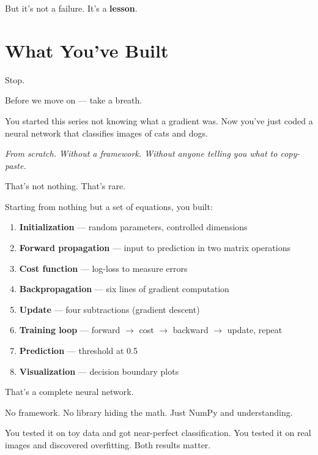 \documentclass[11pt]{article}
\begin{document}
But it's not a failure. It's a \textbf{lesson}.

\section{What You've Built}

Stop.

Before we move on --- take a breath.

You started this series not knowing what a gradient was.
Now you've just coded a neural network that classifies images of cats and dogs.

\textit{From scratch. Without a framework. Without anyone telling you what to copy-paste.}

That's not nothing. That's rare.

Starting from nothing but a set of equations, you built:

\begin{resultbox}[title=Your Neural Network --- From Scratch]
\begin{enumerate}[label=\textbf{\arabic*.}]
  \item \textbf{Initialization} --- random parameters, controlled dimensions
  \item \textbf{Forward propagation} --- input to prediction in two matrix operations
  \item \textbf{Cost function} --- log-loss to measure errors
  \item \textbf{Backpropagation} --- six lines of gradient computation
  \item \textbf{Update} --- four subtractions (gradient descent)
  \item \textbf{Training loop} --- forward $\to$ cost $\to$ backward $\to$ update, repeat
  \item \textbf{Prediction} --- threshold at 0.5
  \item \textbf{Visualization} --- decision boundary plots
\end{enumerate}
\end{resultbox}

That's a complete neural network.

No framework. No library hiding the math. Just NumPy and understanding.

You tested it on toy data and got near-perfect classification.
You tested it on real images and discovered overfitting.
Both results matter.
\end{document}
